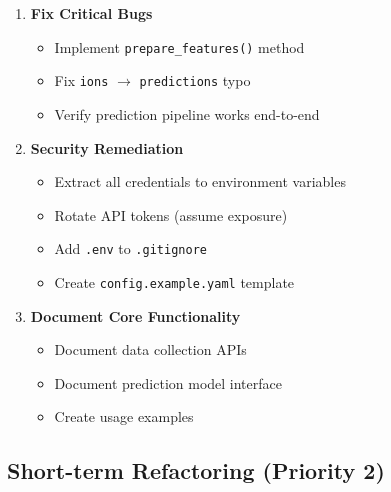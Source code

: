 \documentclass[11pt,a4paper]{article}
\begin{document}
\begin{enumerate}
    \item \textbf{Fix Critical Bugs}
    \begin{itemize}
        \item Implement \texttt{prepare\_features()} method
        \item Fix \texttt{ions} $\rightarrow$ \texttt{predictions} typo
        \item Verify prediction pipeline works end-to-end
    \end{itemize}
    
    \item \textbf{Security Remediation}
    \begin{itemize}
        \item Extract all credentials to environment variables
        \item Rotate API tokens (assume exposure)
        \item Add \texttt{.env} to \texttt{.gitignore}
        \item Create \texttt{config.example.yaml} template
    \end{itemize}
    
    \item \textbf{Document Core Functionality}
    \begin{itemize}
        \item Document data collection APIs
        \item Document prediction model interface
        \item Create usage examples
    \end{itemize}
\end{enumerate}

\subsection{Short-term Refactoring (Priority 2)}
\end{document}
